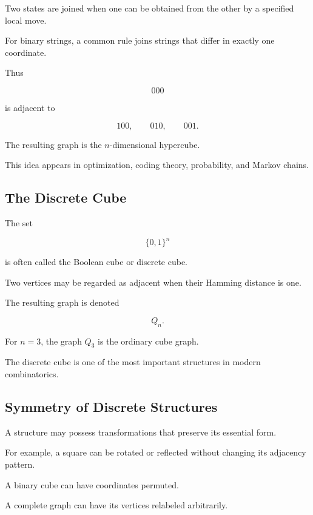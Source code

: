 Two states are joined when one can be obtained from the other by a
specified local move.

For binary strings, a common rule joins strings that differ in exactly
one coordinate.

Thus

\[
000
\]

is adjacent to

\[
100,
\qquad
010,
\qquad
001.
\]

The resulting graph is the \(n\)-dimensional hypercube.

This idea appears in optimization, coding theory, probability, and
Markov chains.

\subsection{The Discrete Cube}
\label{subsec:discrete-cube}

The set

\[
\boxed{
\{0,1\}^{n}
}
\]

is often called the Boolean cube or discrete cube.

Two vertices may be regarded as adjacent when their Hamming distance is
one.

The resulting graph is denoted

\[
Q_n.
\]

For \(n=3\), the graph \(Q_3\) is the ordinary cube graph.

The discrete cube is one of the most important structures in modern
combinatorics.

\subsection{Symmetry of Discrete Structures}
\label{subsec:symmetry-discrete-structures}

A structure may possess transformations that preserve its essential
form.

For example, a square can be rotated or reflected without changing its
adjacency pattern.

A binary cube can have coordinates permuted.

A complete graph can have its vertices relabeled arbitrarily.

